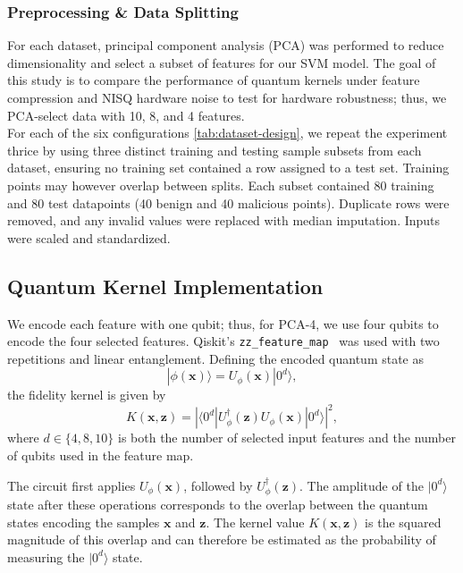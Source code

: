 \documentclass[letterpaper]{article} %
\begin{document}
\subsubsection{Preprocessing \& Data Splitting}
For each dataset, principal component analysis (PCA) was performed to reduce dimensionality and select a subset of features for our SVM model. The goal of this study is to compare the performance of quantum kernels under feature compression and NISQ hardware noise to test for hardware robustness; thus, we PCA-select data with 10, 8, and 4 features. 
\\For each of the six configurations \ref{tab:dataset-design}, we repeat the experiment thrice by using three distinct training and testing sample subsets from each dataset, ensuring no training set contained a row assigned to a test set. Training points may however overlap between splits. Each subset contained 80 training and 80 test datapoints (40 benign and 40 malicious points). Duplicate rows were removed, and any invalid values were replaced with median imputation. Inputs were scaled and standardized. 

\subsection{Quantum Kernel Implementation}

We encode each feature with one qubit; thus, for PCA-4, we use four qubits to encode the four selected features. Qiskit's \texttt{zz\_feature\_map}~\cite{qiskit2024} was used with two repetitions and linear entanglement. Defining the encoded quantum state as
\[
|\phi(\mathbf{x})\rangle = U_{\phi}(\mathbf{x})|0^d\rangle,
\]
the fidelity kernel is given by
\begin{equation}
K(\mathbf{x},\mathbf{z})
=
\left|
\langle 0^d|
U_{\phi}^{\dagger}(\mathbf{z})
U_{\phi}(\mathbf{x})
|0^d\rangle
\right|^2,
\label{eq:fidelity-kernel}
\end{equation}
where $d \in \{4,8,10\}$ is both the number of selected input features and the number of qubits used in the feature map.

The circuit first applies $U_{\phi}(\mathbf{x})$, followed by $U_{\phi}^{\dagger}(\mathbf{z})$. The amplitude of the $|0^d\rangle$ state after these operations corresponds to the overlap between the quantum states encoding the samples $\mathbf{x}$ and $\mathbf{z}$. The kernel value $K(\mathbf{x},\mathbf{z})$ is the squared magnitude of this overlap and can therefore be estimated as the probability of measuring the $|0^d\rangle$ state.
\end{document}
